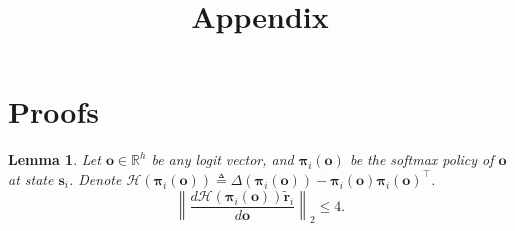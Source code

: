 \documentclass[10pt]{article}
\title{Appendix}
\author{}
\date{}
\def\rvo{{\mathbf{o}}}
\def\rvs{{\mathbf{s}}}
\def\rvo{{\mathbf{o}}}
\def\rvtilder{{\tilde{\mathbf{r}}}}
\newtheorem{lem}{Lemma}
\def\rvpi{{\boldsymbol{\pi}}}
\def\sR{{\mathbb{R}}}
\def\gH{{\mathcal{H}}}
\begin{document}
\maketitle

\section{Proofs}

\begin{lem}
    Let $\rvo \in \sR^h$ be any logit vector, and $\rvpi_i(\rvo)$ be the softmax policy of $\rvo$ at state $\rvs_i$. Denote $\gH\left( \rvpi_i \left(\rvo \right) \right) \triangleq \Delta \left( \rvpi_i \left(\rvo \right) \right) - \rvpi_i \left(\rvo \right) \rvpi_i \left(\rvo \right)^\top$.
\begin{equation*}
    \left\| \frac{d \gH\left( \rvpi_i \left(\rvo \right) \right) \rvtilder_i}{d \rvo } \right\|_2 \le 4.
\end{equation*}
\end{lem}
\end{document}
